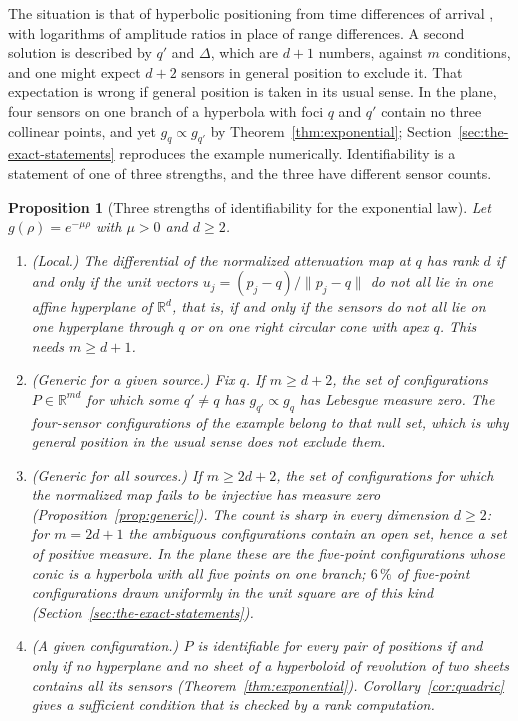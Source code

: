 \documentclass{article}
\newtheorem{proposition}{\bf Proposition}
\begin{document}
The situation is that of hyperbolic positioning from time differences of arrival \cite{ref-Chan, ref-Torrieri}, with logarithms of amplitude ratios in place of range differences. A second solution is described by $q'$ and $\Delta$, which are $d + 1$ numbers, against $m$ conditions, and one might expect $d + 2$ sensors in general position to exclude it. That expectation is wrong if general position is taken in its usual sense. In the plane, four sensors on one branch of a hyperbola with foci $q$ and $q'$ contain no three collinear points, and yet $g_q \propto g_{q'}$ by Theorem~\ref{thm:exponential}; Section~\ref{sec:the-exact-statements} reproduces the example numerically. Identifiability is a statement of one of three strengths, and the three have different sensor counts.

\begin{proposition}[Three strengths of identifiability for the exponential law] \label{prop:levels}
Let $g(\rho) = e^{-\mu\rho}$ with $\mu > 0$ and $d \ge 2$.
\begin{enumerate}
\renewcommand{\labelenumi}{(\alph{enumi})}
\item (Local.) The differential of the normalized attenuation map at $q$ has rank $d$ if and only if the unit vectors $u_j = (p_j - q)/\lVert p_j - q \rVert$ do not all lie in one affine hyperplane of $\mathbb{R}^{d}$, that is, if and only if the sensors do not all lie on one hyperplane through $q$ or on one right circular cone with apex $q$. This needs $m \ge d + 1$.
\item (Generic for a given source.) Fix $q$. If $m \ge d + 2$, the set of configurations $P \in \mathbb{R}^{md}$ for which some $q' \ne q$ has $g_{q'} \propto g_q$ has Lebesgue measure zero. The four-sensor configurations of the example belong to that null set, which is why general position in the usual sense does not exclude them.
\item (Generic for all sources.) If $m \ge 2d + 2$, the set of configurations for which the normalized map fails to be injective has measure zero (Proposition~\ref{prop:generic}). The count is sharp in every dimension $d \ge 2$: for $m = 2d + 1$ the ambiguous configurations contain an open set, hence a set of positive measure. In the plane these are the five-point configurations whose conic is a hyperbola with all five points on one branch; $6\,\%$ of five-point configurations drawn uniformly in the unit square are of this kind (Section~\ref{sec:the-exact-statements}).
\item (A given configuration.) $P$ is identifiable for every pair of positions if and only if no hyperplane and no sheet of a hyperboloid of revolution of two sheets contains all its sensors (Theorem~\ref{thm:exponential}). Corollary~\ref{cor:quadric} gives a sufficient condition that is checked by a rank computation.
\end{enumerate}
\end{proposition}
\end{document}
